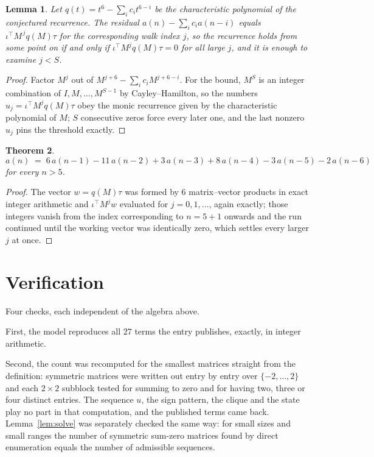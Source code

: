 \documentclass[11pt,a4paper]{article}
\theoremstyle{plain}
\newtheorem{theorem}{Theorem}
\newtheorem{lemma}[theorem]{Lemma}
\theoremstyle{definition}
\begin{document}
\begin{lemma}\label{lem:crit}
Let $q(t)=t^{6}-\sum_i c_it^{6-i}$ be the characteristic polynomial of the
conjectured recurrence. The residual $a(n)-\sum_ic_ia(n-i)$ equals
$\iota^{\!\top}M^{\,j}q(M)\tau$ for the corresponding walk index $j$, so the recurrence
holds from some point on if and only if $\iota^{\!\top}M^{j}q(M)\tau=0$ for all large $j$,
and it is enough to examine $j<S$.
\end{lemma}

\begin{proof}
Factor $M^{j}$ out of $M^{j+6}-\sum_ic_iM^{j+6-i}$. For the bound, $M^{S}$
is an integer combination of $I,M,\dots,M^{S-1}$ by Cayley--Hamilton, so the numbers
$u_j=\iota^{\!\top}M^{j}q(M)\tau$ obey the monic recurrence given by the characteristic
polynomial of $M$; $S$ consecutive zeros force every later one, and the last nonzero $u_j$
pins the threshold exactly.
\end{proof}

\begin{theorem}
\[
a(n)\;=\;6\,a(n-1) - 11\,a(n-2) + 3\,a(n-3) + 8\,a(n-4) - 3\,a(n-5) - 2\,a(n-6)
\]
for every $n>5$.
\end{theorem}

\begin{proof}
The vector $w=q(M)\tau$ was formed by $6$ matrix--vector products in exact integer
arithmetic and $\iota^{\!\top}M^{j}w$ evaluated for $j=0,1,\dots$, again exactly; those
integers vanish from the index corresponding to $n=5+1$ onwards and the run continued
until the working vector was identically zero, which settles every larger $j$ at once.
\end{proof}

\section{Verification}

Four checks, each independent of the algebra above.

First, the model reproduces all $27$ terms the entry publishes, exactly, in integer
arithmetic.

Second, the count was recomputed for the smallest matrices straight from the definition:
symmetric matrices were written out entry by entry over $\{-2,\dots,2\}$ and each
$2\times2$ subblock tested for summing to zero and for having two, three or four distinct entries. The
sequence $u$, the sign pattern, the clique and the state play no part in that computation, and
the published terms came back. Lemma~\ref{lem:solve} was separately checked the same way: for
small sizes and small ranges the number of symmetric sum-zero matrices found by direct
enumeration equals the number of admissible sequences.
\end{document}
